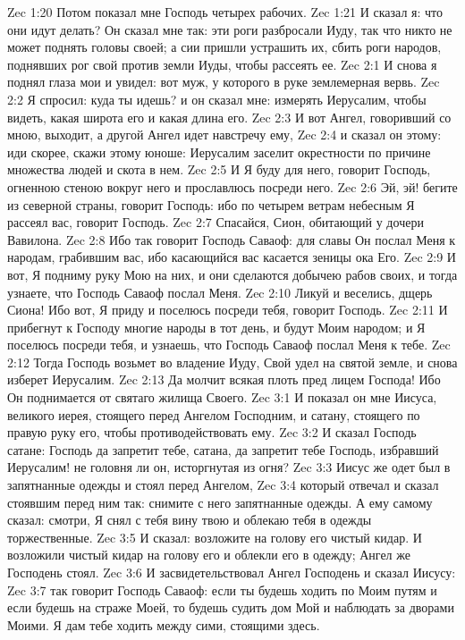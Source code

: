 Zec 1:20  Потом показал мне Господь четырех рабочих.
Zec 1:21  И сказал я: что они идут делать? Он сказал мне так: эти роги разбросали Иуду, так что никто не может поднять головы своей; а сии пришли устрашить их, сбить роги народов, поднявших рог свой против земли Иуды, чтобы рассеять ее.
Zec 2:1  И снова я поднял глаза мои и увидел: вот муж, у которого в руке землемерная вервь.
Zec 2:2  Я спросил: куда ты идешь? и он сказал мне: измерять Иерусалим, чтобы видеть, какая широта его и какая длина его.
Zec 2:3  И вот Ангел, говоривший со мною, выходит, а другой Ангел идет навстречу ему,
Zec 2:4  и сказал он этому: иди скорее, скажи этому юноше: Иерусалим заселит окрестности по причине множества людей и скота в нем.
Zec 2:5  И Я буду для него, говорит Господь, огненною стеною вокруг него и прославлюсь посреди него.
Zec 2:6  Эй, эй! бегите из северной страны, говорит Господь: ибо по четырем ветрам небесным Я рассеял вас, говорит Господь.
Zec 2:7  Спасайся, Сион, обитающий у дочери Вавилона.
Zec 2:8  Ибо так говорит Господь Саваоф: для славы Он послал Меня к народам, грабившим вас, ибо касающийся вас касается зеницы ока Его.
Zec 2:9  И вот, Я подниму руку Мою на них, и они сделаются добычею рабов своих, и тогда узнаете, что Господь Саваоф послал Меня.
Zec 2:10  Ликуй и веселись, дщерь Сиона! Ибо вот, Я приду и поселюсь посреди тебя, говорит Господь.
Zec 2:11  И прибегнут к Господу многие народы в тот день, и будут Моим народом; и Я поселюсь посреди тебя, и узнаешь, что Господь Саваоф послал Меня к тебе.
Zec 2:12  Тогда Господь возьмет во владение Иуду, Свой удел на святой земле, и снова изберет Иерусалим.
Zec 2:13  Да молчит всякая плоть пред лицем Господа! Ибо Он поднимается от святаго жилища Своего.
Zec 3:1  И показал он мне Иисуса, великого иерея, стоящего перед Ангелом Господним, и сатану, стоящего по правую руку его, чтобы противодействовать ему.
Zec 3:2  И сказал Господь сатане: Господь да запретит тебе, сатана, да запретит тебе Господь, избравший Иерусалим! не головня ли он, исторгнутая из огня?
Zec 3:3  Иисус же одет был в запятнанные одежды и стоял перед Ангелом,
Zec 3:4  который отвечал и сказал стоявшим перед ним так: снимите с него запятнанные одежды. А ему самому сказал: смотри, Я снял с тебя вину твою и облекаю тебя в одежды торжественные.
Zec 3:5  И сказал: возложите на голову его чистый кидар. И возложили чистый кидар на голову его и облекли его в одежду; Ангел же Господень стоял.
Zec 3:6  И засвидетельствовал Ангел Господень и сказал Иисусу:
Zec 3:7  так говорит Господь Саваоф: если ты будешь ходить по Моим путям и если будешь на страже Моей, то будешь судить дом Мой и наблюдать за дворами Моими. Я дам тебе ходить между сими, стоящими здесь.
